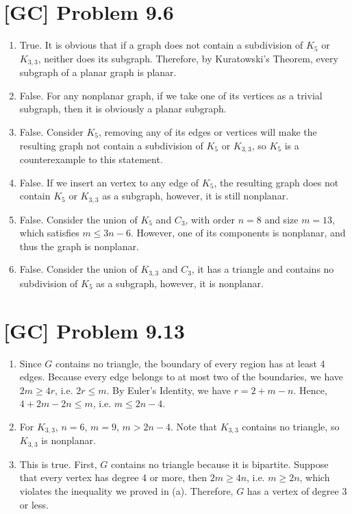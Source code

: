 \documentclass[a4paper,11pt,twocolumn]{article}
\begin{document}
  \section{[GC] Problem 9.6}
  \begin{enumerate}
    \item True. It is obvious that if a graph does not contain a subdivision of $K_5$ or $K_{3,3}$, neither does its subgraph. Therefore, by Kuratowski's Theorem, every subgraph of a planar graph is planar.
    \item False. For any nonplanar graph, if we take one of its vertices as a trivial subgraph, then it is obviously a planar subgraph.
    \item False. Consider $K_5$, removing any of its edges or vertices will make the resulting graph not contain a subdivision of $K_5$ or $K_{3,3}$, so $K_5$ is a counterexample to this statement.
    \item False. If we insert an vertex to any edge of $K_5$, the resulting graph does not contain $K_5$ or $K_{3,3}$ as a subgraph, however, it is still nonplanar.
    \item False. Consider the union of $K_5$ and $C_3$, with order $n = 8$ and size $m = 13$, which satisfies $m \leq 3n-6$. However, one of its components is nonplanar, and thus the graph is nonplanar.
    \item False. Consider the union of $K_{3,3}$ and $C_3$, it has a triangle and contains no subdivision of $K_5$ as a subgraph, however, it is  nonplanar.
  \end{enumerate}
  
  \section{[GC] Problem 9.13}
  \begin{enumerate}
    \item Since $G$ contains no triangle, the boundary of every region has at least 4 edges. Because every edge belongs to at most two of the boundaries, we have $2m \geq 4r$, i.e. $2r \leq m$. By Euler's Identity, we have $r=2+m-n$. Hence, $4+2m-2n \leq m$, i.e. $m \leq 2n-4$.
    \item For $K_{3,3}$, $n = 6$, $m = 9$, $m > 2n - 4$. Note that $K_{3,3}$ contains no triangle, so $K_{3,3}$ is nonplanar.
    \item This is true. First, $G$ contains no triangle because it is bipartite. Suppose that every vertex has degree 4 or more, then $2m \geq 4n$, i.e. $m \geq 2n$, which violates the inequality we proved in (a). Therefore, $G$ has a vertex of degree 3 or less.
  \end{enumerate}
  
\end{document}
